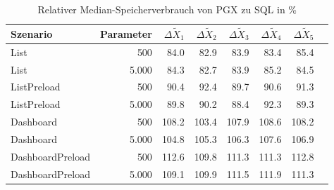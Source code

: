 
\begin{table}[ht]
\setlength{\extrarowheight}{-1pt}
\centering
\caption{Relativer Median-Speicherverbrauch von PGX zu SQL in \%}
\begin{tabular}{lrrrrrrr}
\toprule
Szenario & Parameter & ${\Delta \tilde{X}_1}$ & ${\Delta \tilde{X}_2}$ & ${\Delta \tilde{X}_3}$ & ${\Delta \tilde{X}_4}$ & ${\Delta \tilde{X}_5}$ \\
\midrule
	List & 500 & \cellcolor{green!8}  84.0 & \cellcolor{green!9}  82.9 & \cellcolor{green!8}  83.9 & \cellcolor{green!8}  83.4 & \cellcolor{green!7}  85.4 \\
	List & 5.000 & \cellcolor{green!8}  84.3 & \cellcolor{green!9}  82.7 & \cellcolor{green!8}  83.9 & \cellcolor{green!7}  85.2 & \cellcolor{green!8}  84.5 \\
	ListPreload & 500 & \cellcolor{green!5}  90.4 & \cellcolor{green!4}  92.4 & \cellcolor{green!5}  89.7 & \cellcolor{green!5}  90.6 & \cellcolor{green!4}  91.3 \\
	ListPreload & 5.000 & \cellcolor{green!5}  89.8 & \cellcolor{green!5}  90.2 & \cellcolor{green!6}  88.4 & \cellcolor{green!4}  92.3 & \cellcolor{green!5}  89.3 \\
	Dashboard & 500 & \cellcolor{red!4}  108.2 & \cellcolor{red!2}  103.4 & \cellcolor{red!4}  107.9 & \cellcolor{red!4}  108.6 & \cellcolor{red!4}  108.2 \\
	Dashboard & 5.000 & \cellcolor{red!2}  104.8 & \cellcolor{red!3}  105.3 & \cellcolor{red!3}  106.3 & \cellcolor{red!4}  107.6 & \cellcolor{red!3}  106.9 \\
	DashboardPreload & 500 & \cellcolor{red!6}  112.6 & \cellcolor{red!5}  109.8 & \cellcolor{red!6}  111.3 & \cellcolor{red!6}  111.3 & \cellcolor{red!6}  112.8 \\
	DashboardPreload & 5.000 & \cellcolor{red!5}  109.1 & \cellcolor{red!5}  109.9 & \cellcolor{red!6}  111.5 & \cellcolor{red!6}  111.9 & \cellcolor{red!6}  111.3 \\
\bottomrule
\end{tabular}
\label{tab:relativer_speicherverbrauch_pgx}
\end{table}
	